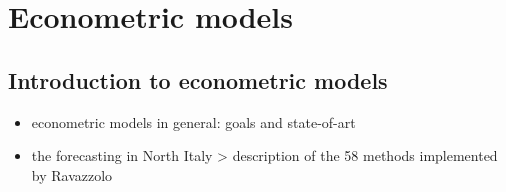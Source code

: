 \section{Econometric models\label{section3.3}}
\subsection{Introduction to econometric models}
\begin{itemize}
    \item econometric models in general: goals and state-of-art
    \item the forecasting in North Italy > description of the 58 methods implemented by Ravazzolo
\end{itemize}



















